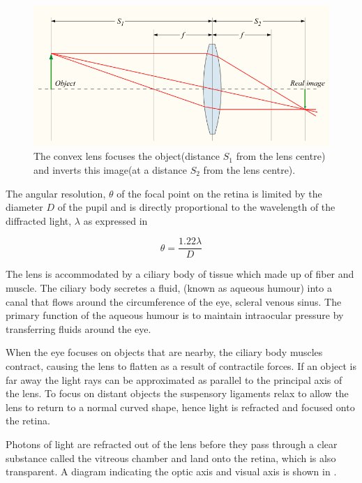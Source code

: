\begin{figure}[htbp]
 \centering
   \includegraphics{figures/convergent_lens2}
 \caption{The convex lens focuses the object(distance $S_1$ from the lens centre) and inverts this image(at a distance $S_2$ from the lens centre). \cite{greivenkamp2004field}}
 \label{fig:convergent_lens}
\end{figure}


The angular resolution, $\theta$ of the focal point on the retina is limited by
the diameter $D$ of the pupil and is directly proportional to the wavelength of
the diffracted light, $\lambda$ as expressed in 

\begin{equation}
\theta=\frac{1.22\lambda}{D}
\label{eq:res_limit}
\end{equation}


The lens is accommodated by a ciliary body of tissue which made up of fiber and muscle.
The ciliary body secretes a fluid, (known as aqueous humour) into a canal that flows
around the circumference of the eye, scleral venous sinus.
\cite{bill1970effects,dvorak1934schlemm} The primary function of the aqueous humour
is to maintain intraocular pressure by transferring fluids around the eye.


When the eye focuses on objects that are nearby, the ciliary body muscles contract,
causing the lens to flatten as a result of contractile forces. If an object is far
away the light rays can be approximated as parallel to the principal axis of the lens.
To focus on distant objects the suspensory ligaments relax to allow the lens to return
to a normal curved shape, hence light is refracted and focused onto the retina.

Photons of light are refracted out of the lens before they pass through
a clear substance called the vitreous chamber and land onto the retina,
which is also transparent. A diagram indicating the optic axis and
visual axis is shown in .

